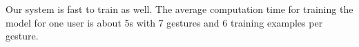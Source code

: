 \documentclass[conference]{IEEEtran}
\begin{document}
Our system is fast to train as well. The average computation time for training
the model for one user is about 5s with 7 gestures and 6 training examples per
gesture.

%
%



%
%

\end{document}
